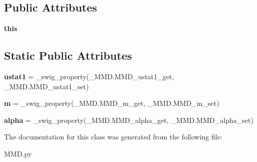 \subsection*{Public Attributes}
\begin{DoxyCompactItemize}
\item 
{\bfseries this}\hypertarget{classMMD_1_1MMD_a14e3274a3e88ea54cfde1a3ed4eac641}{}\label{classMMD_1_1MMD_a14e3274a3e88ea54cfde1a3ed4eac641}

\end{DoxyCompactItemize}
\subsection*{Static Public Attributes}
\begin{DoxyCompactItemize}
\item 
{\bfseries ustat1} = \+\_\+swig\+\_\+property(\+\_\+\+M\+M\+D.\+M\+M\+D\+\_\+ustat1\+\_\+get, \+\_\+\+M\+M\+D.\+M\+M\+D\+\_\+ustat1\+\_\+set)\hypertarget{classMMD_1_1MMD_a9dc94c7b919d32276e18b3613a7683df}{}\label{classMMD_1_1MMD_a9dc94c7b919d32276e18b3613a7683df}

\item 
{\bfseries m} = \+\_\+swig\+\_\+property(\+\_\+\+M\+M\+D.\+M\+M\+D\+\_\+m\+\_\+get, \+\_\+\+M\+M\+D.\+M\+M\+D\+\_\+m\+\_\+set)\hypertarget{classMMD_1_1MMD_a478afe95a3eda78c959ae4c8d59904a1}{}\label{classMMD_1_1MMD_a478afe95a3eda78c959ae4c8d59904a1}

\item 
{\bfseries alpha} = \+\_\+swig\+\_\+property(\+\_\+\+M\+M\+D.\+M\+M\+D\+\_\+alpha\+\_\+get, \+\_\+\+M\+M\+D.\+M\+M\+D\+\_\+alpha\+\_\+set)\hypertarget{classMMD_1_1MMD_a43bb7aebf9650d19a13bc80884cbe1c4}{}\label{classMMD_1_1MMD_a43bb7aebf9650d19a13bc80884cbe1c4}

\end{DoxyCompactItemize}


The documentation for this class was generated from the following file\+:\begin{DoxyCompactItemize}
\item 
M\+M\+D.\+py\end{DoxyCompactItemize}
